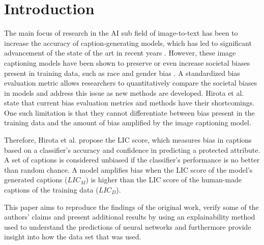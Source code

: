 \section{Introduction}
The main focus of research in the AI sub field of image-to-text has been to increase the accuracy of caption-generating models, which has led to significant advancement of the state of the art in recent years \cite{ChenMuXiaoYeWuJu:2019, fromshowtotell, NEURIPS2019680390c5}. However, these image captioning models have been shown to preserve or even increase societal biases present in training data, such as race and gender bias \cite{menalsolikeshopping}. A standardized bias evaluation metric allows researchers to quantitatively compare the societal biases in models and address this issue as new methods are developed. Hirota et al. \cite{hirotapaper} state that current bias evaluation metrics and methods have their shortcomings. One such limitation is that they cannot differentiate between bias present in the training data and the amount of bias amplified by the image captioning model. \newline

Therefore, Hirota et al. propose the LIC score, which measures bias in captions based on a classifier's accuracy and confidence in predicting a protected attribute. A set of captions is considered unbiased if the classifier's performance is no better than random chance. A model amplifies bias when the LIC score of the model’s generated captions ($LIC_M$) is higher than the LIC score of the human-made captions of the training data ($LIC_D$). \newline

This paper aims to reproduce the findings of the original work, verify 
some of the authors' claims and present additional results by using an explainability method used to understand the predictions of neural 
networks and furthermore provide insight into how the data set that was used.


